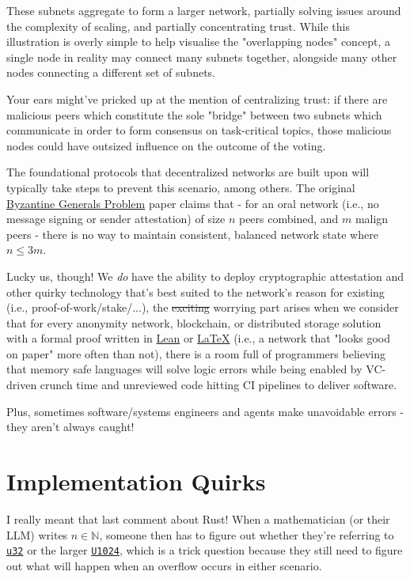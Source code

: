 These subnets aggregate to form a larger network, partially solving issues around the complexity of scaling, and partially concentrating trust. While this illustration is overly simple to help visualise the "overlapping nodes" concept,
         	a single node in reality may connect many subnets together, alongside many other nodes connecting a different set of subnets.

Your ears might've pricked up at the mention of centralizing trust: if there are malicious peers which constitute the sole "bridge" between two subnets which communicate in order to form consensus on task-critical topics, those malicious nodes could have outsized influence on the outcome of the voting.

The foundational protocols that decentralized networks are built upon will typically take steps to prevent this scenario, among others.
        	The original \href{https://lamport.azurewebsites.net/pubs/byz.pdf}{Byzantine Generals Problem} paper claims that - for an oral network
         	(i.e., no message signing or sender attestation) of size $n$ peers combined, and $m$ malign peers - there is no way to maintain consistent, balanced network state where $n \le {3}m$.

Lucky us, though! We \emph{do} have the ability to deploy cryptographic attestation and other quirky technology that's best suited to the network's reason for existing (i.e., proof-of-work/stake/...),
         	the \sout{exciting} worrying part arises when we consider that for every anonymity network, blockchain, or distributed storage solution with a formal proof written in \href{https://lean-lang.org/}{Lean} or \href{https://www.latex-project.org/}{LaTeX} (i.e., a network that "looks good on paper" more often than not), there is a room full of programmers believing that memory safe languages will solve logic errors while being enabled by VC-driven crunch time and unreviewed code hitting CI pipelines to deliver software.

Plus, sometimes software/systems engineers and agents make unavoidable errors - they aren't always caught!

\section{Implementation Quirks}

I really meant that last comment about Rust! When a mathematician (or their LLM) writes $n \in \mathbb{N}$, someone then has to figure out whether they're referring to \href{https://doc.rust-lang.org/std/primitive.u32.html}{\texttt{u32}} or the larger \href{https://docs.rs/bnum/latest/bnum/}{\texttt{U1024}}, which is a trick question because they still need to figure out what will happen when an overflow occurs in either scenario.


